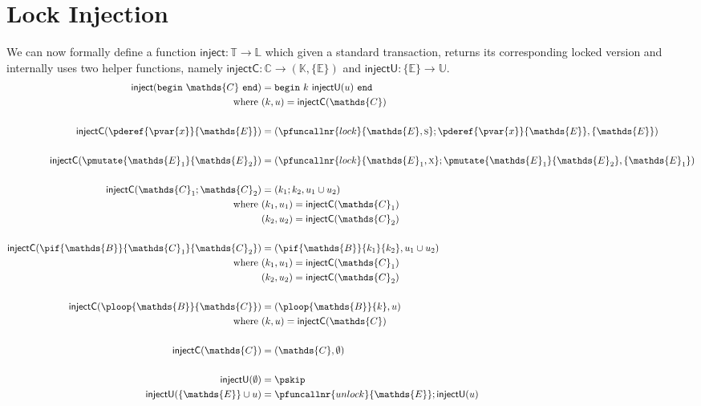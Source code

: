 \section{Lock Injection}

We can now formally define a function $\textsf{inject} : \mathds{T} \rightarrow \mathds{L}$ which given a standard transaction, returns its corresponding locked version and internally uses two helper functions, namely $\textsf{injectC} : \mathds{C} \rightarrow (\mathds{K}, \{\mathds{E}\})$ and $\textsf{injectU} : \{\mathds{E}\} \rightarrow \mathds{U}$.
\begin{align*}
\textsf{inject}(\mathtt{begin}\ \mathds{C}\ \mathtt{end}) &= \mathtt{begin}\ k\ \textsf{injectU}(u)\ \mathtt{end} \\
\text{where } & (k, u) = \textsf{injectC}(\mathds{C}) \\
\\
\textsf{injectC}(\pderef{\pvar{x}}{\mathds{E}}) &= (\pfuncallnr{lock}{\mathds{E}, \textsc{s}}; \pderef{\pvar{x}}{\mathds{E}}, \{ \mathds{E} \}) \\
\\
\textsf{injectC}(\pmutate{\mathds{E}_1}{\mathds{E}_2}) &= (\pfuncallnr{lock}{\mathds{E}_1, \textsc{x}}; \pmutate{\mathds{E}_1}{\mathds{E}_2}, \{ \mathds{E}_1 \}) \\
\\
\textsf{injectC}(\mathds{C}_1; \mathds{C}_2) &= (k_1; k_2, u_1 \cup u_2) \\
\text{where } & (k_1, u_1) = \textsf{injectC}(\mathds{C}_1) \\
& (k_2, u_2) = \textsf{injectC}(\mathds{C}_2) \\
\\
\textsf{injectC}(\pif{\mathds{B}}{\mathds{C}_1}{\mathds{C}_2}) &= (\pif{\mathds{B}}{k_1}{k_2}, u_1 \cup u_2) \\
\text{where } & (k_1, u_1) = \textsf{injectC}(\mathds{C}_1) \\
& (k_2, u_2) = \textsf{injectC}(\mathds{C}_2) \\
\\
\textsf{injectC}(\ploop{\mathds{B}}{\mathds{C}}) &= (\ploop{\mathds{B}}{k}, u) \\
\text{where } & (k, u) = \textsf{injectC}(\mathds{C}) \\
\\
\textsf{injectC}(\mathds{C}) &= (\mathds{C}, \emptyset) \\
\\
\textsf{injectU}(\emptyset) &= \pskip \\ 
\textsf{injectU}(\{\mathds{E}\} \cup u) &= \pfuncallnr{unlock}{\mathds{E}}; \textsf{injectU}(u)
\end{align*}

